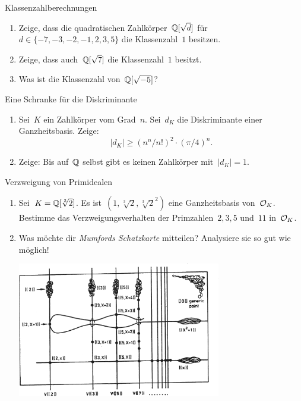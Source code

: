 \documentclass[entwurf]{uebblatt}
\begin{document}

\begin{aufgabe}{Klassenzahlberechnungen}
\begin{enumerate}
\item Zeige, dass die quadratischen Zahlkörper~$\mathbb{Q}[\sqrt{d}]$ für~$d \in \{
-7, -3, -2, -1, 2, 3, 5 \}$ die Klassenzahl~$1$ besitzen.
\item Zeige, dass auch~$\mathbb{Q}[\sqrt{7}]$ die Klassenzahl~$1$ besitzt.
\item Was ist die Klassenzahl von~$\mathbb{Q}[\sqrt{-5}]$?
\end{enumerate}
\end{aufgabe}

\begin{aufgabe}{Eine Schranke für die Diskriminante}
\begin{enumerate}
\item Sei~$K$ ein Zahlkörper vom Grad~$n$. Sei~$d_K$ die Diskriminante einer
Ganzheitsbasis. Zeige:
\[ |d_K| \geq (n^n / n!)^2 \cdot (\pi/4)^n. \]
\item Zeige: Bis auf~$\mathbb{Q}$ selbst gibt es keinen Zahlkörper mit~$|d_K| = 1$.
\end{enumerate}
\end{aufgabe}

\begin{aufgabe}{Verzweigung von Primidealen}
\begin{enumerate}
\item Sei~$K = \mathbb{Q}[\sqrt[3]{2}]$. Es ist~$(1,\sqrt[3]{2},\sqrt[3]{2}^2)$ eine
Ganzheitsbasis von~$\mathcal{O}_K$. Bestimme das Verzweigungsverhalten der
Primzahlen~$2, 3, 5$ und~$11$ in~$\mathcal{O}_K$.
\item Was möchte dir \emph{Mumfords Schatzkarte} mitteilen? Analysiere sie so
gut wie möglich!

\centering\includegraphics[width=0.7\textwidth]{images/mumfords-treasure-map}
\end{enumerate}
\end{aufgabe}
\end{document}

